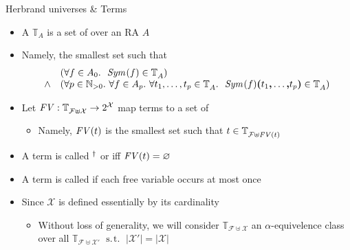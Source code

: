 \documentclass[pdf,fyma2]{prosper} %
\renewcommand{\emptyset}{\varnothing}
\newcommand{\opr}[1]{\ensuremath{\operatorname{#1}}}
\newcommand{\var}[1]{\ensuremath{\text{\textrm{\textit{#1}}}}}
\newcommand{\WHOLE}{\ensuremath{\mathbb{N}_{{>}0}}}
\newcommand{\SYM}[1][]{\ensuremath{\var{Sym}_{#1}}}
\newcommand{\TERMS}[2][]{\ensuremath{\mathbb{T}_{#2}^{#1}}}
\newcommand{\FREEVARS}{\ensuremath{\var{FV}}}
\newcommand{\suchthat}{\ensuremath{\opr{~s.\!t.~}}}
\renewcommand{\emph}[1]{\textbf{#1}}
\begin{document}
\begin{slide}{Herbrand universes \& Terms}
	\vspace{1em}
	\begin{itemize}
    \item A  $\TERMS{A}$ is a set of  over an RA $A$
    \item Namely, the smallest set such that
\[
\begin{array}{rl}
 & (\forall f\in A_0.~
	~\SYM(f) \in \TERMS{A}) \\
\land & (\forall p \in \WHOLE.~
	\forall f\in A_p.~
		\forall t_1,\ldots,t_p \in \TERMS{A}.~
			~\SYM(f)\emph{(}t_1\emph{,}\ldots\emph{,}t_p\emph{)} \in \TERMS{A}) \\
\end{array}
\]
    \item Let $\FREEVARS : \TERMS{\mathcal{F}\uplus\mathcal{X}} \to 2^{\mathcal{X}}$ map terms to a set of 
    	\begin{itemize}
    	\item Namely, $\FREEVARS(t)$ is the smallest set such that $t \in \TERMS{\mathcal{F}\uplus\FREEVARS(t)}$
    	\end{itemize}
    \item A term is called $\null^\dagger$ or  iff $\FREEVARS(t) = \emptyset$
    \item A term is called  if each free variable occurs at most once
	\vspace{1em}
    \item Since $\mathcal{X}$ is defined essentially by its cardinality
        \begin{itemize}
        \item Without loss of generality, we will consider $\TERMS{\mathcal{F}\uplus\mathcal{X}}$ an $\alpha$-equivelence class over all $\TERMS{\mathcal{F}\uplus\mathcal{X'}} \suchthat \lvert\mathcal{X'}\rvert = \lvert\mathcal{X}\rvert$
        \end{itemize}
	\end{itemize}
\end{slide}
\end{document}
